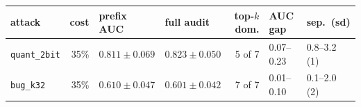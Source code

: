 \begin{tabular}{lrllrll}
\toprule
attack & cost & prefix AUC & full audit & top-$k$ dom. & AUC gap & sep.\ (sd) \\
\midrule
\texttt{quant\_2bit} & 35\% & $0.811 \pm 0.069$ & $0.823 \pm 0.050$ & 5 of 7 & 0.07--0.23 & 0.8--3.2 (1) \\
\texttt{bug\_k32} & 35\% & $0.610 \pm 0.047$ & $0.601 \pm 0.042$ & 7 of 7 & 0.01--0.10 & 0.1--2.0 (2) \\
\bottomrule
\end{tabular}
